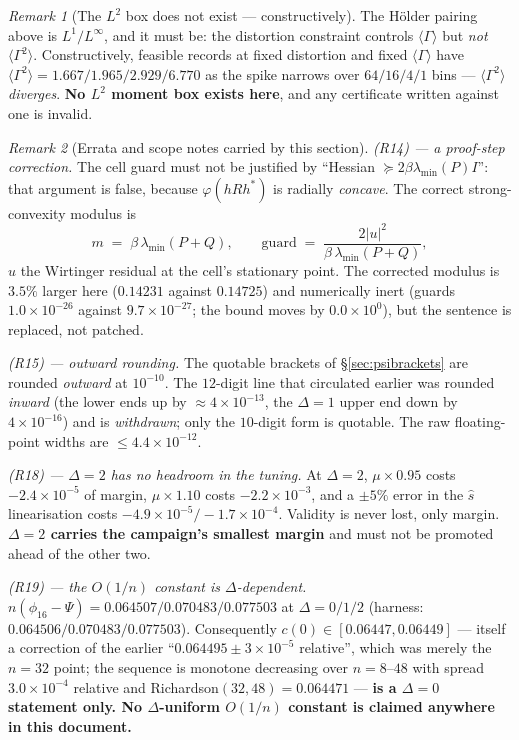 \documentclass[11pt]{article}
\theoremstyle{definition}
\theoremstyle{remark}
\newtheorem{remark}{Remark}
\begin{document}
\begin{remark}[The $L^2$ box does not exist --- constructively]
\label{rem:l2box}
The H\"older pairing above is $L^1/L^\infty$, and it must be: the
distortion constraint controls $\langle\Gamma\rangle$ but \emph{not}
$\langle\Gamma^2\rangle$. Constructively, feasible records at fixed
distortion and fixed $\langle\Gamma\rangle$ have
$\langle\Gamma^2\rangle=1.667/1.965/2.929/6.770$ as the spike narrows
over $64/16/4/1$ bins --- $\langle\Gamma^2\rangle$
\emph{diverges}. \textbf{No $L^2$ moment box exists here}, and any
certificate written against one is invalid.
\end{remark}

\begin{remark}[Errata and scope notes carried by this section]
\label{rem:errata2}
\emph{(R14) --- a proof-step correction.} The cell guard must not be
justified by ``Hessian $\succeq2\beta\lambda_{\min}(P)I$'': that
argument is false, because $\varphi(hRh^\ast)$ is radially
\emph{concave}. The correct strong-convexity modulus is
\[
m\;=\;\beta\,\lambda_{\min}(P+Q),\qquad
\text{guard}\;=\;\frac{2|u|^2}{\beta\,\lambda_{\min}(P+Q)},
\]
$u$ the Wirtinger residual at the cell's stationary point. The
corrected modulus is $3.5\%$ larger here ($0.14231$ against $0.14725$)
and numerically inert (guards $1.0\times10^{-26}$ against
$9.7\times10^{-27}$; the bound moves by $0.0\times10^{0}$), but the
sentence is replaced, not patched.

\emph{(R15) --- outward rounding.} The quotable brackets of
\S\ref{sec:psibrackets} are rounded \emph{outward} at $10^{-10}$. The
$12$-digit line that circulated earlier was rounded \emph{inward} (the
lower ends up by $\approx4\times10^{-13}$, the $\Delta=1$ upper end
down by $4\times10^{-16}$) and is \emph{withdrawn}; only the $10$-digit
form is quotable. The raw floating-point widths are
$\le4.4\times10^{-12}$.

\emph{(R18) --- $\Delta=2$ has no headroom in the tuning.} At
$\Delta=2$, $\mu\times0.95$ costs $-2.4\times10^{-5}$ of margin,
$\mu\times1.10$ costs $-2.2\times10^{-3}$, and a $\pm5\%$ error in the
$\hat s$ linearisation costs $-4.9\times10^{-5}/-1.7\times10^{-4}$.
Validity is never lost, only margin. \textbf{$\Delta=2$ carries the
campaign's smallest margin} and must not be promoted ahead of the other
two.

\emph{(R19) --- the $O(1/n)$ constant is $\Delta$-dependent.}
$n(\phi_{16}-\Psi)=0.064507/0.070483/0.077503$ at $\Delta=0/1/2$
(harness: $0.064506/0.070483/0.077503$). Consequently
$c(0)\in[0.06447,0.06449]$ --- itself a correction of the earlier
``$0.064495\pm3\times10^{-5}$ relative'', which was merely the $n=32$
point; the sequence is monotone decreasing over $n=8$--$48$ with
spread $3.0\times10^{-4}$ relative and Richardson$(32,48)=0.064471$ ---
\textbf{is a $\Delta=0$ statement only. No $\Delta$-uniform $O(1/n)$
constant is claimed anywhere in this document.}


\end{remark}
\end{document}
